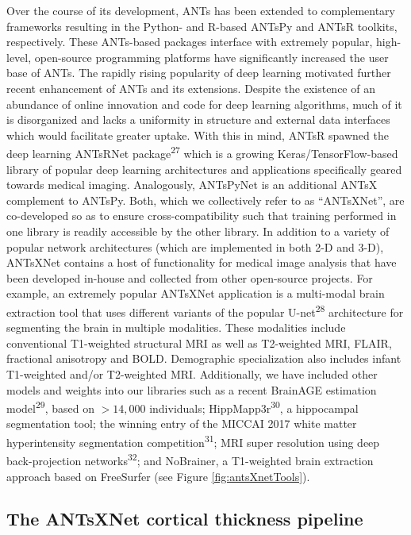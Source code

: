 \documentclass[12pt,]{article}
\begin{document}
Over the course of its development, ANTs has been extended to
complementary frameworks resulting in the Python- and R-based ANTsPy and
ANTsR toolkits, respectively. These ANTs-based packages interface with
extremely popular, high-level, open-source programming platforms have
significantly increased the user base of ANTs. The rapidly rising
popularity of deep learning motivated further recent enhancement of ANTs
and its extensions. Despite the existence of an abundance of online
innovation and code for deep learning algorithms, much of it is
disorganized and lacks a uniformity in structure and external data
interfaces which would facilitate greater uptake. With this in mind,
ANTsR spawned the deep learning ANTsRNet package\textsuperscript{27}
which is a growing Keras/TensorFlow-based library of popular deep
learning architectures and applications specifically geared towards
medical imaging. Analogously, ANTsPyNet is an additional ANTsX
complement to ANTsPy. Both, which we collectively refer to as
``ANTsXNet'', are co-developed so as to ensure cross-compatibility such
that training performed in one library is readily accessible by the
other library. In addition to a variety of popular network architectures
(which are implemented in both 2-D and 3-D), ANTsXNet contains a host of
functionality for medical image analysis that have been developed
in-house and collected from other open-source projects. For example, an
extremely popular ANTsXNet application is a multi-modal brain extraction
tool that uses different variants of the popular
U-net\textsuperscript{28} architecture for segmenting the brain in
multiple modalities. These modalities include conventional T1-weighted
structural MRI as well as T2-weighted MRI, FLAIR, fractional anisotropy
and BOLD. Demographic specialization also includes infant T1-weighted
and/or T2-weighted MRI. Additionally, we have included other models and
weights into our libraries such as a recent BrainAGE estimation
model\textsuperscript{29}, based on \(>14,000\) individuals;
HippMapp3r\textsuperscript{30}, a hippocampal segmentation tool; the
winning entry of the MICCAI 2017 white matter hyperintensity
segmentation competition\textsuperscript{31}; MRI super resolution using
deep back-projection networks\textsuperscript{32}; and NoBrainer, a
T1-weighted brain extraction approach based on FreeSurfer (see Figure
\ref{fig:antsXnetTools}).

\hypertarget{the-antsxnet-cortical-thickness-pipeline}{%
\subsection*{The ANTsXNet cortical thickness
pipeline}\label{the-antsxnet-cortical-thickness-pipeline}}
\end{document}

